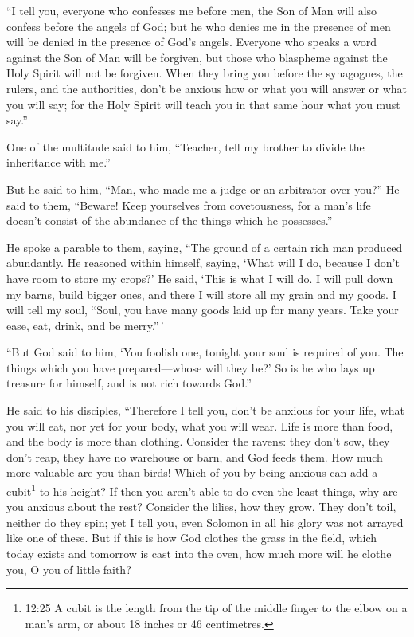  ``I tell you, everyone who confesses me before men, the Son
of Man will also confess before the angels of God;  but he
who denies me in the presence of men will be denied in the presence of
God's angels.  Everyone who speaks a word against the Son
of Man will be forgiven, but those who blaspheme against the Holy Spirit
will not be forgiven.  When they bring you before the
synagogues, the rulers, and the authorities, don't be anxious how or
what you will answer or what you will say;  for the Holy
Spirit will teach you in that same hour what you must say.''

 One of the multitude said to him, ``Teacher, tell my
brother to divide the inheritance with me.''

 But he said to him, ``Man, who made me a judge or an
arbitrator over you?''  He said to them, ``Beware! Keep
yourselves from covetousness, for a man's life doesn't consist of the
abundance of the things which he possesses.''

 He spoke a parable to them, saying, ``The ground of a
certain rich man produced abundantly.  He reasoned within
himself, saying, `What will I do, because I don't have room to store my
crops?'  He said, `This is what I will do. I will pull down
my barns, build bigger ones, and there I will store all my grain and my
goods.  I will tell my soul, ``Soul, you have many goods
laid up for many years. Take your ease, eat, drink, and be merry.''\,'

 ``But God said to him, `You foolish one, tonight your soul
is required of you. The things which you have prepared---whose will they
be?'  So is he who lays up treasure for himself, and is not
rich towards God.''

 He said to his disciples, ``Therefore I tell you, don't be
anxious for your life, what you will eat, nor yet for your body, what
you will wear.  Life is more than food, and the body is
more than clothing.  Consider the ravens: they don't sow,
they don't reap, they have no warehouse or barn, and God feeds them. How
much more valuable are you than birds!  Which of you by
being anxious can add a cubit\footnote{12:25 A cubit is the length from
  the tip of the middle finger to the elbow on a man's arm, or about 18
  inches or 46 centimetres.} to his height?  If then you
aren't able to do even the least things, why are you anxious about the
rest?  Consider the lilies, how they grow. They don't toil,
neither do they spin; yet I tell you, even Solomon in all his glory was
not arrayed like one of these.  But if this is how God
clothes the grass in the field, which today exists and tomorrow is cast
into the oven, how much more will he clothe you, O you of little faith?

